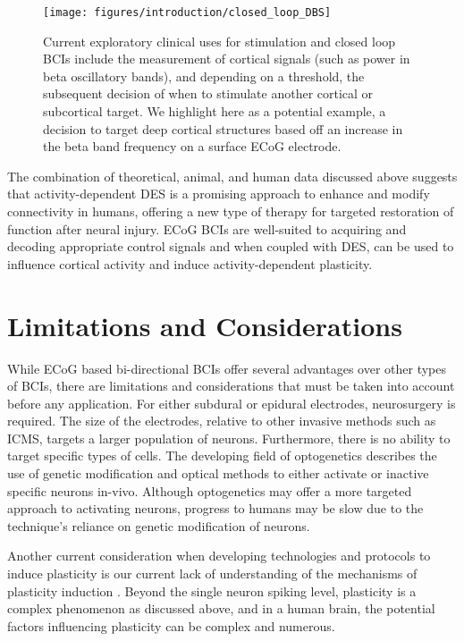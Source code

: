 \begin{figure}[ht]
	\centering
	\texttt{[image: figures/introduction/closed\_loop\_DBS]}
	\caption[BCI cortically driven closed loop stimulation.]{Current exploratory clinical uses for stimulation and closed loop BCIs include the measurement of cortical signals (such as power in beta oscillatory bands), and depending on a threshold, the subsequent decision of when to stimulate another cortical or subcortical target. We highlight here as a potential example, a decision to target deep cortical structures based off an increase in the beta band frequency on a surface ECoG electrode. }
	\label{fig:introClosedLoopDepth}
\end{figure}

The combination of theoretical, animal, and human data discussed above suggests that activity-dependent DES is a promising approach to enhance and modify connectivity in humans, offering a new type of therapy for targeted restoration of function after neural injury. ECoG BCIs are well-suited to acquiring and decoding appropriate control signals and when coupled with DES, can be used to influence cortical activity and induce activity-dependent plasticity. 

\section{Limitations and Considerations}

While ECoG based bi-directional BCIs offer several advantages over other types of BCIs, there are limitations and considerations that must be taken into account before any application. For either subdural or epidural electrodes, neurosurgery is required. The size of the electrodes, relative to other invasive methods such as ICMS, targets a larger population of neurons. Furthermore, there is no ability to target specific types of cells. The developing field of optogenetics \cite{Yizhar2011,Deisseroth2011} describes the use of genetic modification and optical methods to either activate or inactive specific neurons in-vivo. Although optogenetics may offer a more targeted approach to activating neurons, progress to humans may be slow due to the technique’s reliance on genetic modification of neurons. 

Another current consideration when developing technologies and protocols to induce plasticity is our current lack of understanding of the mechanisms of plasticity induction \cite{Feldman2012}. Beyond the single neuron spiking level, plasticity is a complex phenomenon as discussed above, and in a human brain, the potential factors influencing plasticity can be complex and numerous. 

